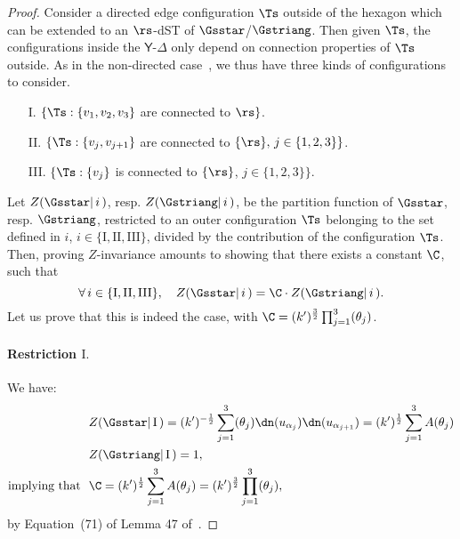 \documentclass[a4paper,twoside,11pt]{article}
\begin{document}
\begin{proof}
Consider a directed edge configuration $\Ts$ outside of the hexagon which can be extended to an $\rs$-dST of $\Gsstar$/$\Gstriang$. 
Then given $\Ts$, the configurations inside the $\mathsf{Y}$-$\Delta$ only depend on connection properties of $\Ts$ outside. 
As in the non-directed case~\cite{Kennelly}, we thus have three kinds of configurations to consider.
\begin{itemize}
 \item[I.] $\{\Ts:\{v_1,v_2,v_3\}$ are connected to $\rs\}$. 
 \item[II.] $\{\Ts:\{v_j,v_{j+1}\}$ are connected to   $\{\rs\},\,j\in\{1,2,3\}\}$.
 \item[III.] $\{\Ts:\{v_j\}$ is connected to  $\{\rs\}$, $j\in\{1,2,3\}\}$.
\end{itemize}

Let $Z(\Gsstar|\,i\,)$, resp. $Z(\Gstriang|\,i\,)$, be the partition function of $\Gsstar$, resp. $\Gstriang$, 
restricted to an outer configuration $\Ts$ belonging to the set defined in $i$,
$i\in\{\mathrm{I},\mathrm{II},\mathrm{III}\}$, divided by the contribution
of the configuration $\Ts$. Then, proving $Z$-invariance amounts to showing that there exists a constant $\C$, such that
\begin{equation*}
\forall\,i\in\{\mathrm{I,II,III}\},\quad Z(\Gsstar|\,i\,)=\C\cdot Z(\Gstriang|\,i\,). 
\end{equation*}
Let us prove that this is indeed the case, with $\C=(k')^{\frac{3}{2}}\prod_{j=1}^3 \sc(\theta_j)$.

\paragraph{Restriction $\mathrm{I}.$}
We have:
\begin{align}
&Z(\Gsstar|\,\mathrm{I}\,)=(k')^{-\frac{1}{2}}\sum_{j=1}^3 \sc(\theta_j)\dn(u_{\alpha_{j}}) \dn(u_{\alpha_{j+1}})=
(k')^{\frac{1}{2}}\sum_{j=1}^3 A(\theta_j)\nonumber\\
&Z(\Gstriang|\,\mathrm{I}\,)=1,\nonumber\\
\text{implying that }\ &\C=(k')^{\frac{1}{2}}\sum_{j=1}^3 A(\theta_j)=(k')^{\frac{3}{2}}\prod_{j=1}^3 \sc(\theta_j)\label{equ:cst_C},
\end{align}
by Equation~(71) of Lemma 47 of~\cite{BdTR1}.

\end{proof}
\end{document}
